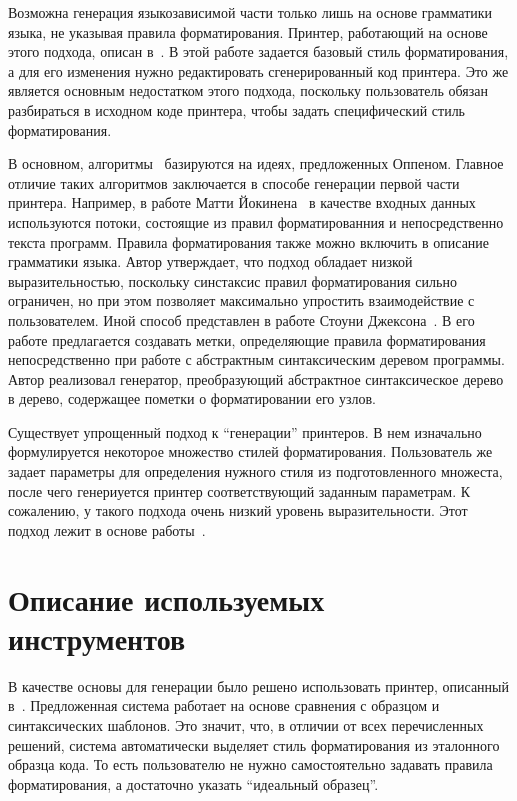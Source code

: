Возможна генерация языкозависимой части только лишь на основе грамматики языка, не указывая правила форматирования. Принтер, работающий на основе этого подхода, описан в~\cite{oppenlike:brand}. В этой работе задается базовый стиль форматирования, а для его изменения нужно редактировать сгенерированный код принтера. Это же является основным недостатком этого подхода, поскольку пользователь обязан разбираться в исходном коде принтера, чтобы задать специфический стиль форматирования.

В основном, алгоритмы~\cite{jonge, jokinen, jackson} базируются на идеях, предложенных Оппеном. Главное отличие таких алгоритмов заключается в способе генерации первой части принтера. Например, в работе Матти Йокинена~\cite{jokinen} в качестве входных данных используются потоки, состоящие из правил форматированния и непосредственно текста программ. Правила форматирования также можно включить в описание грамматики языка. Автор утверждает, что подход обладает низкой выразительностью, поскольку синстаксис правил форматирования сильно ограничен, но при этом позволяет максимально упростить взаимодействие с пользователем. Иной способ представлен в работе Стоуни Джексона~\cite{jackson}. В его работе предлагается создавать метки, определяющие правила форматирования непосредственно при работе с абстрактным синтаксическим деревом программы. Автор реализовал генератор, преобразующий абстрактное синтаксическое дерево в дерево, содержащее пометки о форматировании его узлов.

Существует упрощенный подход к ``генерации'' принтеров. В нем изначально формулируется некоторое множество стилей форматирования. Пользователь же задает параметры для определения нужного стиля из подготовленного множеста, после чего генериуется принтер соответствующий заданным параметрам. К сожалению, у такого подхода очень низкий уровень выразительности. Этот подход лежит в основе работы~\cite{blaschek}.

\section{Описание используемых инструментов}
В качестве основы для генерации было решено использовать принтер, описанный в~\cite{podkopaev:diploma}. Предложенная система работает на основе сравнения с образцом и синтаксических шаблонов. Это значит, что, в отличии от всех перечисленных решений, система автоматически выделяет стиль форматирования из эталонного образца кода. То есть пользователю не нужно самостоятельно задавать правила форматирования, а достаточно указать ``идеальный образец''. 

